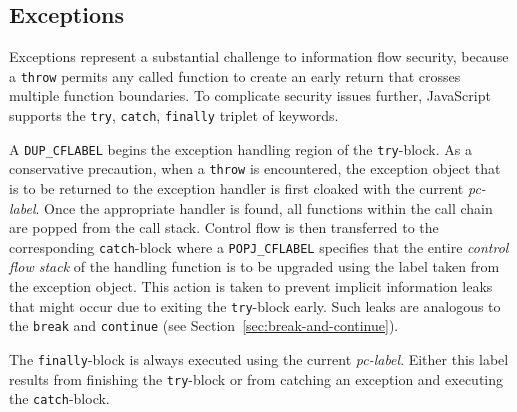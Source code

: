 \documentclass{llncs}
\begin{document}
\subsection{Exceptions}
\label{sec:exceptions}
Exceptions represent a substantial challenge to information flow security, because a \texttt{throw} permits any called function to create an early return that crosses multiple function boundaries.
To complicate security issues further, JavaScript supports the \texttt{try}, \texttt{catch}, \texttt{finally} triplet of keywords.

A \texttt{DUP\_CFLABEL} begins the exception handling region of the \texttt{try}-block.
As a conservative precaution, when a \texttt{throw} is encountered, the exception object that is to be returned to the exception handler is first cloaked with the current \textit{pc-label}.
Once the appropriate handler is found, all functions within the call chain are popped from the call stack.
Control flow is then transferred to the corresponding \texttt{catch}-block where a \texttt{POPJ\_CFLABEL} specifies that the entire \textit{control flow stack} of the handling function is to be upgraded using the label taken from the exception object.
This action is taken to prevent implicit information leaks that might occur due to exiting the \texttt{try}-block early.
Such leaks are analogous to the \texttt{break} and \texttt{continue} (see Section~\ref{sec:break-and-continue}).

The \texttt{finally}-block is always executed using the current \textit{pc-label}.
Either this label results from finishing the \texttt{try}-block or from catching an exception and executing the \texttt{catch}-block.
\end{document}
